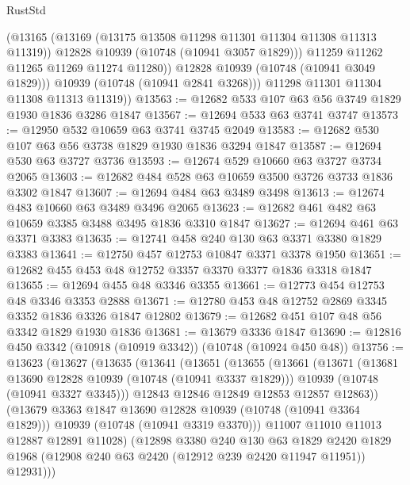 \begin{lexlean}{RustStd}
\begin{coremodule}
{\begin{coremodule}
{{{{{                (@13165
                  (@13169 (@13175 @13508 @11298 @11301 @11304 @11308 @11313 @11319))
                  @12828
                  @10939
                  (@10748 (@10941 @3057 @1829)))
                @11259
                @11262
                @11265
                @11269
                @11274
                @11280))
            @12828
            @10939
            (@10748 (@10941 @3049 @1829)))
          @10939
          (@10748 (@10941 @2841 @3268)))
        @11298
        @11301
        @11304
        @11308
        @11313
        @11319))
@13563 := @12682 @533 @107 @63 @56 @3749 @1829 @1930 @1836 @3286 @1847
@13567 := @12694 @533 @63 @3741 @3747
@13573 := @12950 @532 @10659 @63 @3741 @3745 @2049
@13583 := @12682 @530 @107 @63 @56 @3738 @1829 @1930 @1836 @3294 @1847
@13587 := @12694 @530 @63 @3727 @3736
@13593 := @12674 @529 @10660 @63 @3727 @3734 @2065
@13603 := @12682 @484 @528 @63 @10659 @3500 @3726 @3733 @1836 @3302 @1847
@13607 := @12694 @484 @63 @3489 @3498
@13613 := @12674 @483 @10660 @63 @3489 @3496 @2065
@13623 := @12682 @461 @482 @63 @10659 @3385 @3488 @3495 @1836 @3310 @1847
@13627 := @12694 @461 @63 @3371 @3383
@13635 := @12741 @458 @240 @130 @63 @3371 @3380 @1829 @3383
@13641 := @12750 @457 @12753 @10847 @3371 @3378 @1950
@13651 := @12682 @455 @453 @48 @12752 @3357 @3370 @3377 @1836 @3318 @1847
@13655 := @12694 @455 @48 @3346 @3355
@13661 := @12773 @454 @12753 @48 @3346 @3353 @2888
@13671 := @12780 @453 @48 @12752 @2869 @3345 @3352 @1836 @3326 @1847 @12802
@13679 := @12682 @451 @107 @48 @56 @3342 @1829 @1930 @1836
@13681 := @13679 @3336 @1847
@13690 := @12816 @450 @3342 (@10918 (@10919 @3342)) (@10748 (@10924 @450 @48))
@13756 := @13623
    (@13627
      (@13635
        (@13641
          (@13651
            (@13655
              (@13661
                (@13671
                  (@13681 @13690 @12828 @10939 (@10748 (@10941 @3337 @1829)))
                  @10939
                  (@10748 (@10941 @3327 @3345)))
                @12843
                @12846
                @12849
                @12853
                @12857
                @12863))
            (@13679 @3363 @1847 @13690 @12828 @10939 (@10748 (@10941 @3364 @1829)))
            @10939
            (@10748 (@10941 @3319 @3370)))
          @11007
          @11010
          @11013
          @12887
          @12891
          @11028)
        (@12898
          @3380
          @240
          @130
          @63
          @1829
          @2420
          @1829
          @1968
          (@12908 @240 @63 @2420 (@12912 @239 @2420 @11947 @11951))
          @12931)))
}}}}}
\end{coremodule}}
\end{coremodule}
\end{lexlean}
